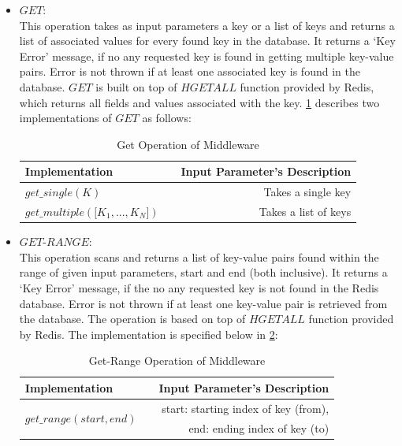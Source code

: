 \begin{itemize}
\item[-] $GET:$ \\
This operation takes as input parameters a key or a list of keys and returns a list of associated values for every found key in the database. It returns a ‘Key Error’ message, if no any requested key is found in getting multiple key-value pairs. Error is not thrown if at least one associated key is found in the database. $GET$ is built on top of $HGETALL$ function provided by Redis, which returns all fields and values associated with the key.  \cref{get_op} describes two implementations of $GET$ as follows: 
\begin{table} [H]
\centering
\begin{tabular}{@{} lcr @{}} %
	\toprule
	Implementation && Input Parameter’s Description	\\
	\midrule
	$get\_single (K)$	&&	Takes a single key  \\
	$get\_multiple(\bigl[K_{1}, ... , K_{N}\bigr])$	&&	Takes a list of keys\\
	\bottomrule
\end{tabular}
\caption[]{Get Operation of Middleware}
\label{get_op}
\end{table}

\item[-] $GET$-$RANGE:$ \\
This operation scans and returns a list of key-value pairs found within the range of given input parameters, start and end (both inclusive). It returns a ‘Key Error’ message, if the no any requested key is not found in the Redis database. Error is not thrown if at least one key-value pair is retrieved from the database. The operation is based on top of $HGETALL$ function provided by Redis. The implementation is specified below in \cref{get_range_op}: 
\begin{table} [H]
\centering
\begin{tabular}{@{} lcr @{}} %
	\toprule
	Implementation && Input Parameter’s Description	\\
	\midrule
	\multirow{2}{*}{$get\_range(start, end)$}	&&	start: starting index of key (from), \\
		&&	end: ending index of key (to)  \\
	\bottomrule
\end{tabular}
\caption[]{Get-Range Operation of Middleware}
\label{get_range_op}
\end{table}


\end{itemize}
